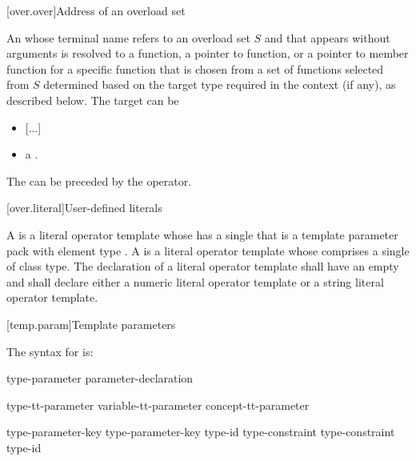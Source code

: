 \documentclass{wg21}
\begin{document}
[over.over]{Address of an overload set}%

\pnum
An 
whose terminal name refers to an overload set $S$ and
that appears without arguments
is resolved to
a function,
a pointer to function, or
a pointer to member function
for a specific function
that is chosen from a set of functions selected from $S$
determined based on the target type required in the context (if any),
as described below.
The target can be
\begin{itemize}
    \item \textcolor{noteclr}{[...]}
    \item
    a  .
\end{itemize}
The  can be preceded by the \tcode{\&} operator.

[over.literal]{User-defined literals}%

\pnum
A 
is a literal operator template whose 
has a single 
that is a  template parameter pack
with element type .
A 
is a literal operator template whose 
comprises
a single \linebreak
{} of class type.
The declaration of a literal operator template
shall have an empty 
and shall declare either a numeric literal operator template
or a string literal operator template.


[temp.param]{Template parameters}


\pnum
The syntax for
is:

\begin{bnf}
    \br
    type-parameter\br
    parameter-declaration\br
\begin{addedblock}
    type-tt-parameter \br
    variable-tt-parameter \br
    concept-tt-parameter
\end{addedblock}
\end{bnf}

\begin{bnf}
    \br
    type-parameter-key  \br
    type-parameter-key  \terminal{=} type-id\br
    type-constraint  \br
    type-constraint  \terminal{=} type-id\br
\end{bnf}
\end{document}
